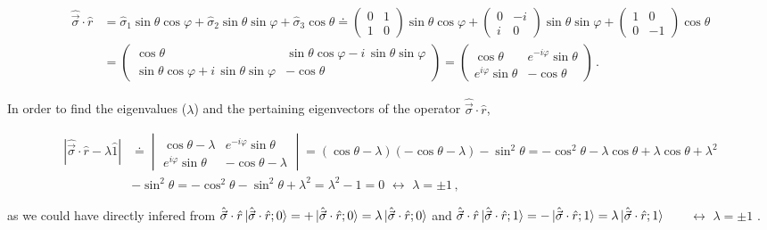 \documentclass[11pt]{article}
\numberwithin{equation}{section} %
\numberwithin{figure}{section} %
\begin{document}
\begin{appendices}
\begin{equation} 
\begin{split}
\hat{\vec{\sigma}}\cdot\hat{r} &=\hat{\sigma}_1\sin\theta\cos\varphi+\hat{\sigma}_2\sin\theta\sin\varphi+\hat{\sigma}_3\cos\theta\doteq\begin{pmatrix}0&1\\1&0\end{pmatrix}\sin\theta\cos\varphi+\begin{pmatrix}0&-i\\i&0\end{pmatrix}\sin\theta\sin\varphi+\begin{pmatrix}1&0\\0&-1\end{pmatrix}\cos\theta\\
 &=\begin{pmatrix}\cos\theta&\sin\theta\cos\varphi-i\,\sin\theta\sin\varphi\\\sin\theta\cos\varphi+i\,\sin\theta\sin\varphi&-\cos\theta\end{pmatrix}=\begin{pmatrix}\cos\theta&e^{-i\varphi}\sin\theta\\e^{i\varphi}\sin\theta&-\cos\theta\end{pmatrix}
\,\textrm{.}\end{split}
\end{equation}

In order to find the eigenvalues ($\lambda$) and the pertaining eigenvectors of the operator $\hat{\vec{\sigma}}\cdot\hat{r}$,

\begin{equation} \label{Bloch_eigenvalues}
\begin{split}
|\hat{\vec{\sigma}}\cdot\hat{r}-\lambda\hat{1}|
&\doteq\begin{vmatrix}\cos\theta-\lambda&e^{-i\varphi}\sin\theta\\e^{i\varphi}\sin\theta&-\cos\theta-\lambda\end{vmatrix}=(\cos\theta-\lambda)(-\cos\theta-\lambda)-\sin^2\theta=-\cos^2\theta-\lambda\cos\theta+\lambda\cos\theta+\lambda^2\\
&-\sin^2\theta=-\cos^2\theta-\sin^2\theta+\lambda^2=\lambda^2-1=0\,\,\leftrightarrow\,\,\lambda=\pm 1
\,\textrm{,}\end{split}
\end{equation}

as we could have directly infered from $\hat{\vec{\sigma}}\cdot\hat{r}\ket{\hat{\vec{\sigma}}\cdot\hat{r};0}=+\ket{\hat{\vec{\sigma}}\cdot\hat{r};0}=\lambda\ket{\hat{\vec{\sigma}}\cdot\hat{r};0}$ and $\hat{\vec{\sigma}}\cdot\hat{r}\ket{\hat{\vec{\sigma}}\cdot\hat{r};1}=-\ket{\hat{\vec{\sigma}}\cdot\hat{r};1}=\lambda\ket{\hat{\vec{\sigma}}\cdot\hat{r};1}$  $\,\,\,$ \cite[p.~xxix, l.~24]{Nielsen}  $\,\,\,$  $\leftrightarrow$ $\lambda=\pm 1$ .\\


\end{appendices}
\end{document}
